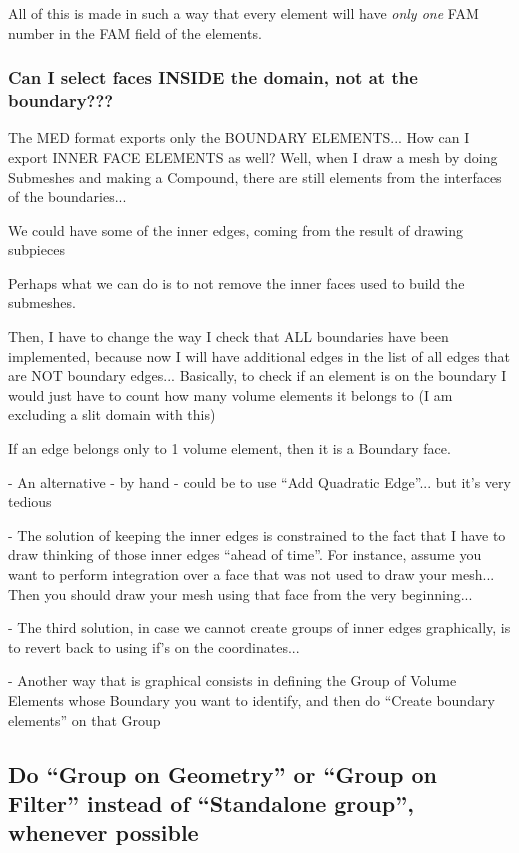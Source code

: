 \documentclass[10pt]{book}
\begin{document}
 All of this is made in such a way that every element 
 will have \textit{only one} FAM number in the FAM field of the elements.
 

\subsubsection{Can I select faces INSIDE the domain, not at the boundary???}

 The MED format exports only the BOUNDARY ELEMENTS...
 How can I export INNER FACE ELEMENTS as well?
 Well, when I draw a mesh by doing Submeshes and making a Compound,
 there are still elements from the interfaces of the boundaries...
 
 We could have some of the inner edges, coming from the result of drawing subpieces 

 Perhaps what we can do is to not remove the inner faces used to build the submeshes.
 
 Then, I have to change the way I check that ALL boundaries have been implemented,
 because now I will have additional edges in the list of all edges
 that are NOT boundary edges...
 Basically, to check if an element is on the boundary I would 
 just have to count how many volume elements it belongs to
 (I am excluding a slit domain with this)
 
 If an edge belongs only to 1 volume element, then it is a Boundary face.
 
 
 - An alternative - by hand - could be to use ``Add Quadratic Edge''... but it's very tedious
 
 - The solution of keeping the inner edges is constrained to the fact 
   that I have to draw thinking of those inner edges ``ahead of time''.
   For instance, assume you want to perform integration over a face 
   that was not used to draw your mesh... 
   Then you should draw your mesh using that face from the very beginning...
   
 - The third solution, in case we cannot create groups of inner edges graphically,
    is to revert back to using if's on the coordinates...  
 
 - Another way that is graphical consists in defining the Group of Volume Elements
 whose Boundary you want to identify,
 and then do ``Create boundary elements'' on that Group
 
 
 \subsection{Do ``Group on Geometry'' or ``Group on Filter'' instead of ``Standalone group'',
          whenever possible}
          
\end{document}
